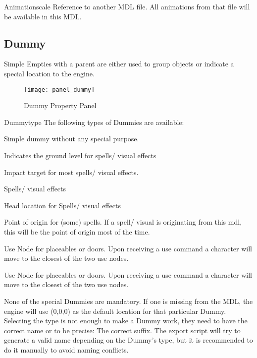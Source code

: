 \begin{property}{Animationscale}
Reference to another MDL file. All animations from that file 
will be available in this MDL.
\end{property}

\subsection{Dummy}
Simple Empties with a parent are either used to group objects or
indicate a special location to the engine. \\

\begin{figure}
  \centering
  \texttt{[image: panel\_dummy]}
  \caption[panel dummy]{Dummy Property Panel}
  \label{fig:panel_dummy}
\end{figure}

\begin{property}{Dummytype}
The following types of Dummies are available:
\begin{description}[leftmargin=6em,style=nextline]
    \item[None] Simple dummy without any special purpose.
    \item[Ground] Indicates the ground level for spells/ visual effects
    \item[Impact] Impact target for most spells/ visual effects.
    \item[Head Hit] Spells/ visual effects
    \item[Head] Head location for Spells/ visual effects
    \item[Hand] Point of origin for (some) spells. If a spell/ visual is originating from this mdl, this will be the point of origin most of the time.
    \item[Use 1] Use Node for placeables or doors. Upon receiving a use command a character will move to the closest of the two use nodes.
    \item[Use 2] Use Node for placeables or doors. Upon receiving a use command a character will move to the closest of the two use nodes.
\end{description}
\end{property}
None of the special Dummies are mandatory. If one is
missing from the MDL, the engine will use (0,0,0) as the default location
for that particular Dummy. \\

Selecting the type is not enough to make a Dummy work, they need to have
the correct name or to be precise: The correct suffix.
The export script will try to generate a valid name depending on
the Dummy's type, but it is recommended to do it manually to avoid naming
conflicts. \\

